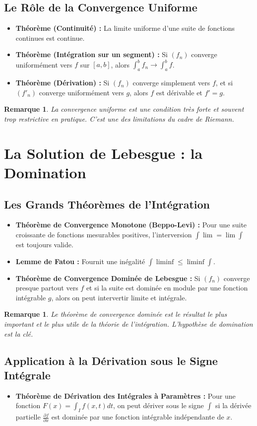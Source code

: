 \documentclass[12pt, a4paper, parskip=full]{report}
\theoremstyle{agregstyle}
\newtheorem{remark}[definition]{Remarque}
\begin{document}
\subsection{Le Rôle de la Convergence Uniforme}
\begin{itemize}
    \item \textbf{Théorème (Continuité) :} La limite uniforme d'une suite de fonctions continues est continue.
    \item \textbf{Théorème (Intégration sur un segment) :} Si $(f_n)$ converge uniformément vers $f$ sur $[a,b]$, alors $\int_a^b f_n \to \int_a^b f$.
    \item \textbf{Théorème (Dérivation) :} Si $(f_n)$ converge simplement vers $f$, et si $(f'_n)$ converge uniformément vers $g$, alors $f$ est dérivable et $f'=g$.
\end{itemize}
\begin{remark}
    La convergence uniforme est une condition très forte et souvent trop restrictive en pratique. C'est une des limitations du cadre de Riemann.
\end{remark}

\section{La Solution de Lebesgue : la Domination}
\subsection{Les Grands Théorèmes de l'Intégration}
\begin{itemize}
    \item \textbf{Théorème de Convergence Monotone (Beppo-Levi) :} Pour une suite croissante de fonctions mesurables positives, l'interversion $\int \lim = \lim \int$ est toujours valide.
    \item \textbf{Lemme de Fatou :} Fournit une inégalité $\int \liminf \le \liminf \int$.
    \item \textbf{Théorème de Convergence Dominée de Lebesgue :} Si $(f_n)$ converge presque partout vers $f$ et si la suite est dominée en module par une fonction intégrable $g$, alors on peut intervertir limite et intégrale.
\end{itemize}
\begin{remark}
    Le théorème de convergence dominée est le résultat le plus important et le plus utile de la théorie de l'intégration. L'hypothèse de domination est la clé.
\end{remark}
\subsection{Application à la Dérivation sous le Signe Intégrale}
\begin{itemize}
    \item \textbf{Théorème de Dérivation des Intégrales à Paramètres :} Pour une fonction $F(x) = \int_I f(x,t)dt$, on peut dériver sous le signe $\int$ si la dérivée partielle $\frac{\partial f}{\partial x}$ est dominée par une fonction intégrable indépendante de $x$.
\end{itemize}
\end{document}
